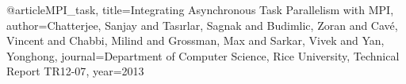 
@article{MPI_task,
  title={Integrating Asynchronous Task Parallelism with MPI},
  author={Chatterjee, Sanjay and Tas{\i}rlar, Sagnak and Budimlic, Zoran and Cav{\'e}, Vincent and Chabbi, Milind and Grossman, Max and Sarkar, Vivek and Yan, Yonghong},
  journal={Department of Computer Science, Rice University, Technical Report TR12-07},
  year={2013}
}